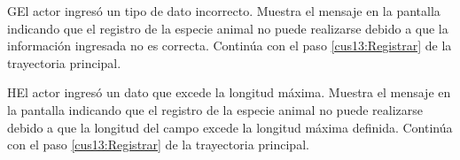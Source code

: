     \begin{UCtrayectoriaA}{G}{El actor ingresó un tipo de dato incorrecto.}    
    \UCpaso[\UCsist] Muestra el mensaje  en la pantalla  indicando que el registro de la especie animal no puede realizarse debido a que la información ingresada no es correcta.
    \UCpaso[] Continúa con el paso \ref{cus13:Registrar} de la trayectoria principal.     
    \end{UCtrayectoriaA}
    
    \begin{UCtrayectoriaA}{H}{El actor ingresó un dato que excede la longitud máxima.}    
    \UCpaso[\UCsist] Muestra el mensaje  en la pantalla  indicando que el registro de la especie animal no puede realizarse debido a que la longitud del campo excede la longitud máxima definida.
    \UCpaso[] Continúa con el paso \ref{cus13:Registrar} de la trayectoria principal.     
    \end{UCtrayectoriaA}
